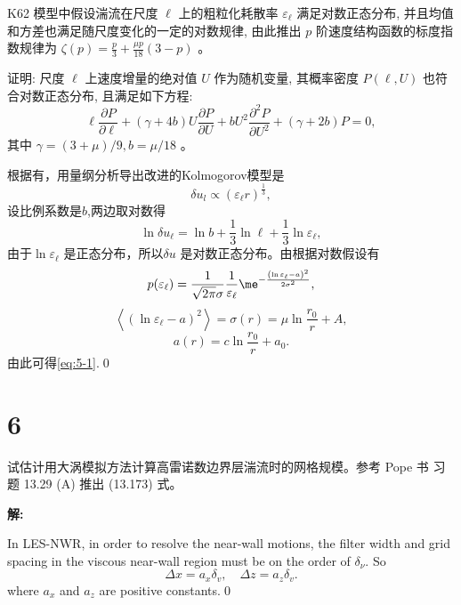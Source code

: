 \documentclass[12pt,a4]{ctexart}
\begin{document}
K62 \citep{kolmogorov_1962} 模型中假设湍流在尺度 $\ell$ 上的粗粒化耗散率 $\varepsilon_{\ell}$ 满足对数正态分布, 并且均值和方差也满足随尺度变化的一定的对数规律, 由此推出 $p$ 阶速度结构函数的标度指数规律为 $\zeta(p)=\frac{p}{3}+\frac{\mu p}{18}(3-p)$ 。

证明: 尺度 $\ell$ 上速度增量的绝对值 $U$ 作为随机变量, 其概率密度 $P(\ell, U)$ 也符合对数正态分布, 且满足如下方程:
\begin{equation}
   \ell \frac{\partial P}{\partial \ell}+(\gamma+4 b) U \frac{\partial P}{\partial U}+b U^{2} \frac{\partial^{2} P}{\partial U^{2}}+(\gamma+2 b) P=0,
   \label{eq:5-1}
\end{equation}
其中 $\gamma=(3+\mu) / 9, b=\mu / 18$ 。

根据\cite[P71]{zhang17}有，用量纲分析导出改进的Kolmogorov模型是
\begin{equation}
   \delta u_l \propto (\varepsilon_{\ell} r)^{\frac{1}{3}},
\end{equation}
设比例系数是$b$,两边取对数得
\begin{equation}
   \ln \delta u_{\ell} = \ln b + \frac{1}{3} \ln \ell + \frac{1}{3} \ln \varepsilon_{\ell},
\end{equation}
由于$\ln \varepsilon_{\ell}$ 是正态分布，所以$\delta u$ 是对数正态分布。由根据对数假设有
\begin{equation}
   p(\varepsilon_{\ell}) = \frac{1}{\sqrt{2\pi} \sigma} \frac{1}{\varepsilon_{\ell}} \me^{-\frac{\left( \ln \varepsilon_{\ell} - a \right)^2 }{2 \sigma^2}},
\end{equation}
\begin{equation}
   \left< \left( \ln \varepsilon_{\ell} - a \right)^2  \right> = \sigma(r) = \mu \ln \frac{r_0}{r} + A,
\end{equation}
\begin{equation}
   a(r) = c\ln \frac{r_0}{r} + a_0.
\end{equation}
由此可得\cref{eq:5-1}.\qed


\section{6}

试估计用大涡模拟方法计算高雷诺数边界层湍流时的网格规模。参考 Pope 书
习题 13.29 (A) 推出 (13.173) 式。


\textsf{\hspace{-2em}\sf  \textbf{解:}}

In LES-NWR, in order to resolve the near-wall motions, the filter width and grid spacing in the viscous near-wall region must be on the order of $\delta_{\nu}$.\cite{pop} So
\begin{equation}
   \Delta x=a_{x} \delta_{v}, \quad \Delta z=a_{z} \delta_{v}.
\end{equation}
where $a_x$ and $a_z$ are positive constants.\qed
\end{document}
